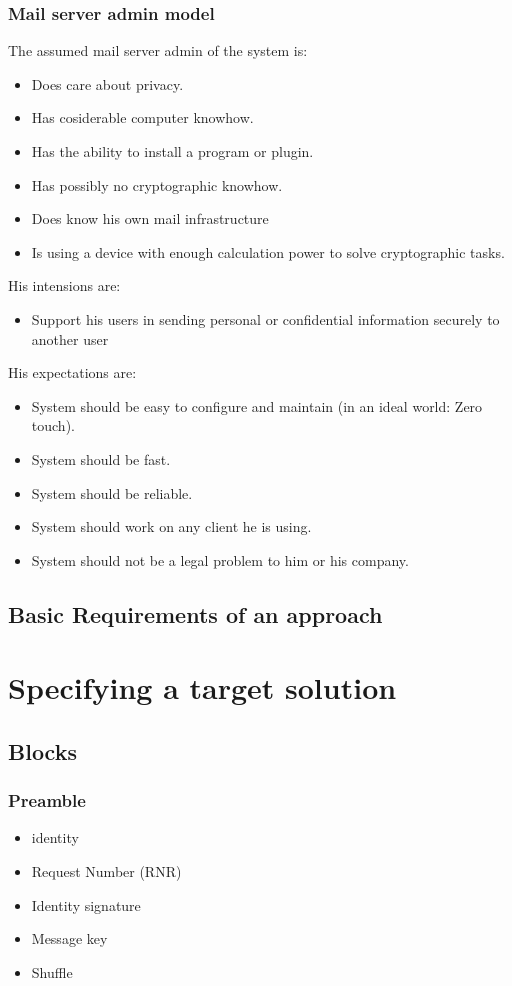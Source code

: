 \subsection{Mail server admin model}
The assumed mail server admin of the system is:
\begin{itemize}
\item Does care about privacy.
\item Has cosiderable computer knowhow.
\item Has the ability to install a program or plugin.
\item Has possibly no cryptographic knowhow.
\item Does know his own mail infrastructure
\item Is using a device with enough calculation power to solve cryptographic tasks.
\end{itemize}
His intensions are:
\begin{itemize}
\item Support his users in sending personal or confidential information securely to another user
\end{itemize}
His expectations are:
\begin{itemize}
\item System should be easy to configure and maintain (in an ideal world: Zero touch). 
\item System should be fast.
\item System should be reliable.
\item System should work on any client he is using.
\item System should not be a legal problem to him or his company.
\end{itemize}

\section{Basic Requirements of an approach}

\chapter{Specifying a target solution}
\section{Blocks}
\subsection{Preamble}
\begin{itemize}
  \item identity
  \item Request Number (RNR)
  \item Identity signature
  \item Message key
  \item Shuffle
\end{itemize}

